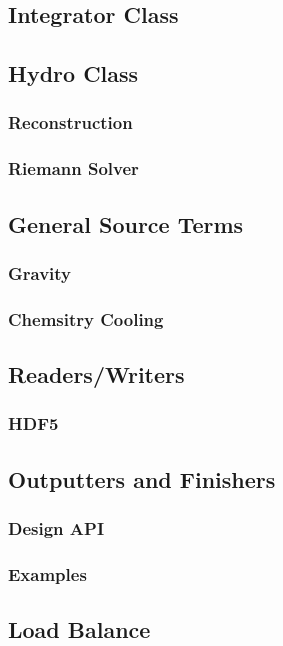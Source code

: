 \subsection{Integrator Class}

\subsection{Hydro Class}
\subsubsection{Reconstruction}
\subsubsection{Riemann Solver}

\subsection{General Source Terms}
\subsubsection{Gravity}
\subsubsection{Chemsitry Cooling}

\subsection{Readers/Writers}
\subsubsection{HDF5}

\subsection{Outputters and Finishers}
\subsubsection{Design API}
\subsubsection{Examples}

\subsection{Load Balance}

